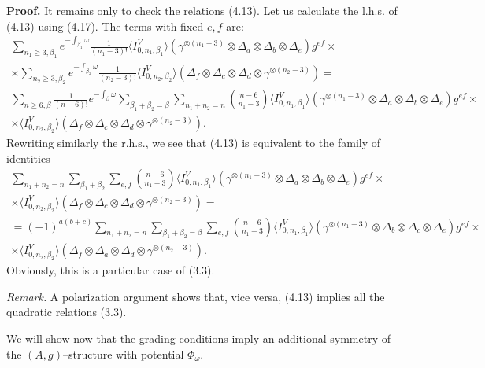 \documentclass[reqno]{amsart}
\theoremstyle{definition}
\begin{document}
{\bf Proof.}
It remains only to check the relations (4.13).
Let us calculate the l.h.s. of (4.13) using (4.17). The terms
with fixed $e,f$ are:
\begin{gather*}
  \sum_{n_1\ge 3,\beta_1}e^{-\int_{\beta_1}\omega }\frac{1}{(n_1-3)!}
  \langle I^V_{0,n_1,\beta_1}\rangle
  (\gamma^{\otimes (n_1-3)}\otimes\Delta_a\otimes\Delta_b\otimes
  \Delta_e)g^{ef}\times
  \\
  \times
  \sum_{n_2\ge 3,\beta_2}e^{-\int_{\beta_2}\omega}\frac{1}{(n_2-3)!}
  \langle I^V_{0,n_2,\beta_2}\rangle
  (\Delta_f\otimes\Delta_c\otimes\Delta_d\otimes\gamma^{\otimes (n_2-3)})=
  \\
  \sum_{n\ge 6,\beta} \frac{1}{(n-6)!}
  e^{-\int_{\beta}\omega }
  \sum_{\beta_1+\beta_2=\beta}
  \sum_{n_1+n_2=n}
  {\binom{n-6}{n_1-3}}
  \langle I^V_{0,n_1,\beta_1}\rangle
  (\gamma^{\otimes (n_1-3)}\otimes\Delta_a\otimes\Delta_b\otimes
  \Delta_e)g^{ef}\times
  \\
  \times\langle I^V_{0,n_2,\beta_2}\rangle
  (\Delta_f\otimes\Delta_c\otimes\Delta_d\otimes\gamma^{\otimes (n_2-3)}).
\end{gather*}
Rewriting similarly the r.h.s., we see that (4.13) is equivalent to
the family of identities
\begin{gather*}
  \sum_{n_1+n_2=n}\sum_{\beta_1+\beta_2}\sum_{e,f}
  {\binom{n-6}{n_1-3}}\langle I^V_{0,n_1,\beta_1}\rangle
  (\gamma^{\otimes
  (n_1-3)}\otimes\Delta_a\otimes\Delta_b\otimes\Delta_e)g^{ef}\times
  \\
  \times\langle I^V_{0,n_2,\beta_2}\rangle
  (\Delta_f\otimes\Delta_c\otimes\Delta_d\otimes
  \gamma^{\otimes (n_2-3)})=
  \\
  =(-1)^{a(b+c)}\sum_{n_1+n_2=n}\sum_{\beta_1+\beta_2=\beta}\sum_{e,f}
  {\binom{n-6}{n_1-3}}\langle I^V_{0,n_1,\beta_1}\rangle
  (\gamma^{\otimes (n_1-3)}\otimes\Delta_b\otimes\Delta_c\otimes\Delta_e)
  g^{ef}\times
  \\
  \times
  \langle I^V_{0,n_2,\beta_2}\rangle
  (\Delta_f\otimes\Delta_a\otimes\Delta_d\otimes\gamma^{\otimes (n_2-3)}).
\end{gather*}
Obviously, this is a particular case of (3.3).

\smallskip

{\it Remark.}
A polarization argument shows that, vice versa, (4.13)
implies all the quadratic relations (3.3).

\smallskip

We will show now that the grading conditions imply an additional
symmetry of the $(A,g)$--structure with potential $\Phi_{\omega}$.
\end{document}
